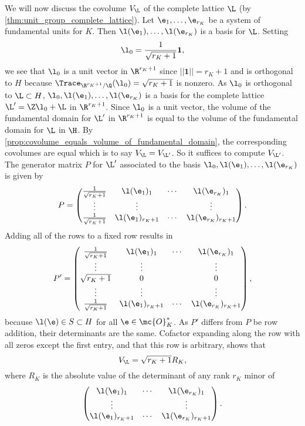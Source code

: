       We will now discuss the covolume $V_{\L}$ of the complete lattice $\L$ (by \cref{thm:unit_group_complete_lattice}). Let $\e_{1},\ldots,\e_{r_{K}}$ be a system of fundamental units for $K$. Then $\l(\e_{1}),\ldots,\l(\e_{r_{K}})$ is a basis for $\L$. Setting
      \[
        \l_{0} = \frac{1}{\sqrt{r_{K}+1}}\mathbf{1},
      \]
      we see that $\l_{0}$ is a unit vector in $\R^{r_{K}+1}$ since $||\mathbf{1}|| = r_{K}+1$ and is orthogonal to $H$ because $\Trace_{\R^{r_{K}+1}/\Q}(\l_{0}) = \sqrt{r_{K}+1}$ is nonzero. As $\l_{0}$ is orthogonal to $\L \subset H$, $\l_{0},\l(\e_{1}),\ldots,\l(\e_{r_{K}})$ is a basis for the complete lattice $\L' = \Z\l_{0}+\L$ in $\R^{r_{K}+1}$. Since $\l_{0}$ is a unit vector, the volume of the fundamental domain for $\L'$ in $\R^{r_{K}+1}$ is equal to the volume of the fundamental domain for $\L$ in $\H$. By \cref{prop:covolume_equals_volume_of_fundamental_domain}, the corresponding covolumes are equal which is to say $V_{\L} = V_{\L'}$. So it suffices to compute $V_{\L'}$. The generator matrix $P$ for $\L'$ associated to the basis $\l_{0},\l(\e_{1}),\ldots,\l(\e_{r_{K}})$ is given by
      \[
        P = \begin{pmatrix} \frac{1}{\sqrt{r_{K}+1}} & \l(\e_{1})_{1} & \cdots & \l(\e_{r_{K}})_{1} \\ \vdots & \vdots & & \vdots \\ \frac{1}{\sqrt{r_{K}+1}} & \l(\e_{1})_{r_{K}+1} & \cdots & \l(\e_{r_{K}})_{r_{K}+1} \end{pmatrix}.
      \]
      Adding all of the rows to a fixed row results in
      \[
        P' = \begin{pmatrix} \frac{1}{\sqrt{r_{K}+1}} & \l(\e_{1})_{1} & \cdots & \l(\e_{r_{K}})_{1} \\ \vdots & \vdots & & \vdots \\ \sqrt{r_{K}+1} & 0 & & 0 \\ \vdots & \vdots & & \vdots \\ \frac{1}{\sqrt{r_{K}+1}} & \l(\e_{1})_{r_{K}+1} & \cdots & \l(\e_{r_{K}})_{r_{K}+1} \end{pmatrix},
      \]
      because $\l(\e) \in S \subset H$ for all $\e \in \mc{O}_{K}^{\ast}$. As $P'$ differs from $P$ be row addition, their determinants are the same. Cofactor expanding along the row with all zeros except the first entry, and that this row is arbitrary, shows that
      \[
        V_{\L} = \sqrt{r_{K}+1}R_{K},
      \]
      where $R_{K}$ is the absolute value of the determinant of any rank $r_{K}$ minor of
      \[
        \begin{pmatrix} \l(\e_{1})_{1} & \cdots & \l(\e_{r_{K}})_{1} \\ \vdots & & \vdots \\ \l(\e_{1})_{r_{K}+1} & \cdots & \l(\e_{r_{K}})_{r_{K}+1}  \end{pmatrix}.
      \]
